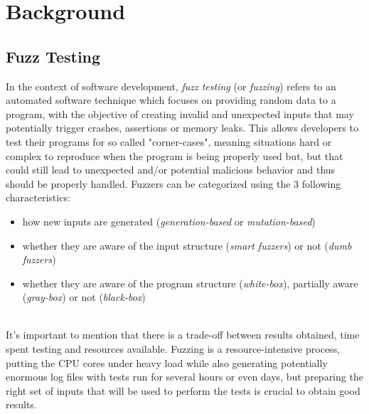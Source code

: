 \chapter{Background}





\newpage
\section{Fuzz Testing}
In the context of software development, \textit{fuzz testing} (or \textit{fuzzing}) refers to an automated software technique which focuses on providing random data to a program, with the objective of creating invalid and unexpected inputs that may potentially trigger crashes, assertions or memory leaks.
\newline 
This allows developers to test their programs for so called "corner-cases", meaning situations hard or complex to reproduce when the program is being properly used but, but that could still lead to unexpected and/or potential malicious behavior and thus should be properly handled. 
\newline \newline
Fuzzers can be categorized using the 3 following characteristics:
\begin{itemize}
    \item how new inputs are generated (\textit{generation-based} or \textit{mutation-based})
    \item whether they are aware of the input structure (\textit{smart fuzzers}) or not (\textit{dumb fuzzers})
    \item whether they are aware of the program structure (\textit{white-box}), partially aware (\textit{gray-box}) or not (\textit{black-box})
\end{itemize}
\ \\
It's important to mention that there is a trade-off between results obtained, time spent testing and resources available.
\newline
Fuzzing is a resource-intensive process, putting the CPU cores under heavy load while also generating potentially enormous log files with tests run for several hours or even days, but preparing the right set of inputs that will be used to perform the tests is crucial to obtain good results.
